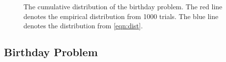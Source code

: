 \documentclass[12pt]{article}
\theoremstyle{definition}
\DeclareMathOperator{\pr}{\mathrm{P}}		     %
\DeclareMathOperator{\cov}{\uptau_\textrm{cov}}  %
\begin{document}
\begin{figure}[ht]
\centering
{}
\caption{The cumulative distribution of the birthday problem. The red line denotes the empirical distribution from 1000 trials. The blue line denotes the distribution from \cref{eqn:dist}.}\label{fig:birthday}
\end{figure}


\newpage
{}

\newpage
\begin{appendices}
\subsection{Birthday Problem}\label{app:birthday}

\end{appendices}
\end{document}
